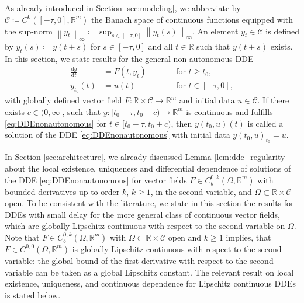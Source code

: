 \documentclass[10pt]{article}
\numberwithin{equation}{section}
\newcommand*{\dd}{\mathrm{d}}
\newcommand\norm[1]{\left\lVert#1\right\rVert}
\begin{document}
	As already introduced in Section \ref{sec:modeling}, we abbreviate by $\mathcal{C}\coloneqq C^0([-\tau,0],\mathbb{R}^m)$ the Banach space of continuous functions equipped with the sup-norm $\norm{y_t}_\infty \coloneqq \sup_{s\in[-\tau,0]} \norm{y_t(s)}_\infty$. An element $y_t \in \mathcal{C}$ is defined by $y_t(s)\coloneqq y(t+s)$ for $s\in[-\tau,0]$ and all $t\in \mathbb{R}$ such that $y(t+s)$ exists. In this section, we state results for the general non-autonomous DDE
	\begin{equation}\label{eq:DDEnonautonomous}
		\begin{aligned}
			\frac{\dd y}{\dd t} &= F(t,y_t) \qquad &&\text{for } t\geq t_0, \\  
			y_{t_0}(t) &= u(t) &&\text{for } t \in [-\tau,0],
		\end{aligned}
	\end{equation}
	with globally defined vector field $F:\mathbb{R}\times \mathcal{C}\rightarrow \mathbb{R}^m$ and initial data $u\in \mathcal{C}$. If there exists $c\in(0,\infty]$, such that $y:[t_0-\tau,t_0+c)\rightarrow \mathbb{R}^m$ is continuous and fulfills \eqref{eq:DDEnonautonomous} for $t \in [t_0-\tau, t_0+c)$, then $y(t_0,u)(t)$ is called a solution of the DDE \eqref{eq:DDEnonautonomous} with initial data $y(t_0,u)_{t_0} = u$.
	
	In Section \ref{sec:architecture}, we already discussed Lemma \ref{lem:dde_regularity} about the local existence, uniqueness and differential dependence of solutions of the DDE \eqref{eq:DDEnonautonomous} for vector fields $F\in C^{0,k}_b(\Omega,\mathbb{R}^m)$ with bounded derivatives up to order $k$, $k \geq 1$, in the second variable, and $\Omega \subset \mathbb{R}\times \mathcal{C}$ open. To be consistent with the literature, we state in this section the results for DDEs with small delay for the more general class of continuous vector fields, which are globally Lipschitz continuous with respect to the second variable on $\Omega$. Note that $F\in C^{0,k}_b(\Omega,\mathbb{R}^m)$ with $\Omega \subset \mathbb{R}\times \mathcal{C}$ open and $k \geq 1$ implies, that $F\in C^{0,0}(\Omega,\mathbb{R}^m)$ is globally Lipschitz continuous with respect to the second variable: the global bound of the first derivative with respect to the second variable can be taken as a global Lipschitz constant. The relevant result on local existence, uniqueness, and continuous dependence for Lipschitz continuous DDEs is stated below.
	
\end{document}

